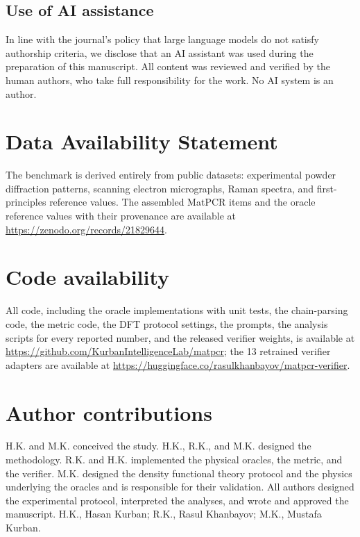 \documentclass[pdflatex,sn-nature]{sn-jnl}
\newcommand{\rev}[1]{#1}
\newcommand{\rev}[1]{{\color{blue}#1}}
\begin{document}
\subsection*{Use of AI assistance}
In line with the journal's policy that large language models do not satisfy
authorship criteria, we disclose that an AI assistant was used during the preparation of
this manuscript. All content was reviewed and verified by the human authors, who take
full responsibility for the work. No AI system is an author.

\section*{Data Availability Statement}
The benchmark is derived entirely from public datasets: experimental powder diffraction
patterns,\cite{opxrd2025} scanning electron micrographs,\cite{aversa2018nffa} Raman
spectra,\cite{lafuente2015rruff} and first-principles reference values.\cite{matproj2013} The assembled MatPCR items and the oracle
reference values with their provenance are available at \url{https://zenodo.org/records/21829644}.

\section*{Code availability}
All code, including the oracle implementations with unit tests, the chain-parsing
code, the metric code, the DFT protocol settings, the prompts, \rev{the analysis scripts for every
reported number,} and the released
verifier weights, is available at \url{https://github.com/KurbanIntelligenceLab/matpcr}\rev{; the
13 retrained verifier adapters are available at \url{https://huggingface.co/rasulkhanbayov/matpcr-verifier}.}

\section*{Author contributions}
H.K. and M.K. conceived the study. H.K., R.K., and M.K. designed the methodology.
R.K. and H.K. implemented the physical oracles, the metric, and the verifier. M.K.
designed the density functional theory protocol and the physics underlying the oracles
and is responsible for their validation. All authors designed the experimental protocol,
interpreted the analyses, and wrote and approved the manuscript. H.K., Hasan Kurban; R.K., Rasul
Khanbayov; M.K., Mustafa Kurban.
\end{document}
